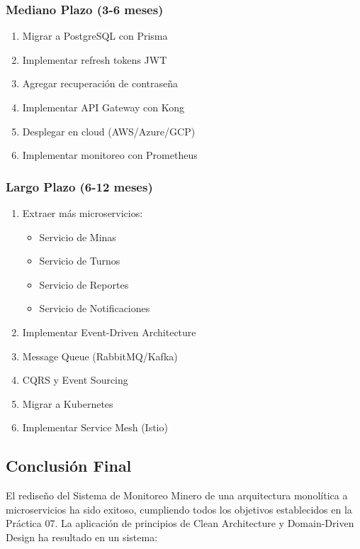 \documentclass[12pt,a4paper]{article}
\begin{document}
\subsubsection{Mediano Plazo (3-6 meses)}

\begin{enumerate}[leftmargin=*]
    \item Migrar a PostgreSQL con Prisma
    \item Implementar refresh tokens JWT
    \item Agregar recuperación de contraseña
    \item Implementar API Gateway con Kong
    \item Desplegar en cloud (AWS/Azure/GCP)
    \item Implementar monitoreo con Prometheus
\end{enumerate}

\subsubsection{Largo Plazo (6-12 meses)}

\begin{enumerate}[leftmargin=*]
    \item Extraer más microservicios:
    \begin{itemize}
        \item Servicio de Minas
        \item Servicio de Turnos
        \item Servicio de Reportes
        \item Servicio de Notificaciones
    \end{itemize}
    \item Implementar Event-Driven Architecture
    \item Message Queue (RabbitMQ/Kafka)
    \item CQRS y Event Sourcing
    \item Migrar a Kubernetes
    \item Implementar Service Mesh (Istio)
\end{enumerate}

\subsection{Conclusión Final}

El rediseño del Sistema de Monitoreo Minero de una arquitectura monolítica a microservicios ha sido exitoso, cumpliendo todos los objetivos establecidos en la Práctica 07. La aplicación de principios de Clean Architecture y Domain-Driven Design ha resultado en un sistema:
\end{document}
